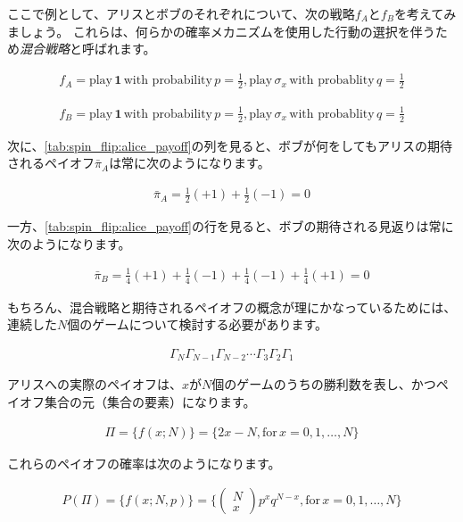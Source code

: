 ここで例として、アリスとボブのそれぞれについて、次の戦略$f_A$と$f_B$を考えてみましょう。
これらは、何らかの確率メカニズムを使用した行動の選択を伴うため\emph{混合戦略}と呼ばれます。

\begin{align}
f_A = \text{play}\, \mathbf{1}\, \text{with probability}\, p = \frac{1}{2},
    \text{play}\, \sigma_x\, \text{with probablity}\, q = \frac{1}{2}
\end{align}

\begin{align}
f_B = \text{play}\, \mathbf{1}\, \text{with probability}\, p = \frac{1}{2},
    \text{play}\, \sigma_x\, \text{with probablity}\, q = \frac{1}{2}
\end{align}

次に、\autoref{tab:spin_flip:alice_payoff}の列を見ると、ボブが何をしてもアリスの期待されるペイオフ$\bar{\pi}_A$は常に次のようになります。

\begin{align}
\bar{\pi}_A = \frac{1}{2}(+1) + \frac{1}{2}(-1) = 0
\end{align}

一方、\autoref{tab:spin_flip:alice_payoff}の行を見ると、ボブの期待される見返りは常に次のようになります。

\begin{align}
\bar{\pi}_B = \frac{1}{4}(+1) + \frac{1}{4}(-1) + \frac{1}{4}(-1) + \frac{1}{4}(+1) = 0
\end{align}

もちろん、混合戦略と期待されるペイオフの概念が理にかなっているためには、連続した$N$個のゲームについて検討する必要があります。

\begin{align}
\Gamma_N \Gamma_{N-1} \Gamma_{N-2} \cdots \Gamma_{3} \Gamma_{2} \Gamma_{1}  
\end{align}

アリスへの実際のペイオフは、$x$が$N$個のゲームのうちの勝利数を表し、かつペイオフ集合の元（集合の要素）になります。

\begin{align}
\Pi = \{f(x;N)\} = \{ 2x - N, \text{for}\, x = 0,1,\dots,N \} \label{eq:alice_payoff_set}
\end{align}

これらのペイオフの確率は次のようになります。

\begin{align}
P(\Pi) = \{f(x;N, p)\} = \{ 
  \left(\begin{array}{c}
    N \\
    x
  \end{array}\right) p^x q^{N-x}, \text{for}\, x = 0,1,\dots ,N
\}
\end{align}

